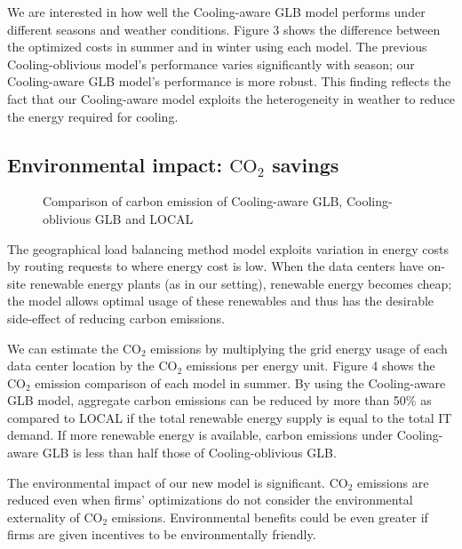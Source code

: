 \documentclass{acm_proc_article-sp}
\newcommand{\carbondioxide}{\ensuremath{\mathrm{CO}_2}}
\begin{document}
We are interested in how well the Cooling-aware GLB model performs under different seasons and weather conditions. Figure 3 shows the difference between the optimized costs in summer and in winter using each model. The previous Cooling-oblivious model's performance varies significantly with season; our Cooling-aware GLB model's performance is more robust. This finding reflects the fact that our Cooling-aware model exploits the heterogeneity in weather to reduce the energy required for cooling.



\subsection{Environmental impact: \carbondioxide{} savings}


\begin{figure}
\centering
{}
\caption{Comparison of carbon emission of Cooling-aware GLB, Cooling-oblivious GLB and LOCAL}
\end{figure}


The geographical load balancing method model exploits variation in energy costs by routing requests to where energy cost is low. When the data centers have on-site renewable energy plants (as in our setting), renewable energy becomes cheap; the model allows optimal usage of these renewables and thus has the desirable side-effect of reducing carbon emissions.

We can estimate the \carbondioxide{} emissions by multiplying the grid energy usage of each data center location by the \carbondioxide{} emissions per energy unit. Figure 4 shows the \carbondioxide{} emission comparison of each model in summer. By using the Cooling-aware GLB model, aggregate carbon emissions can be reduced by more than 50\% as compared to LOCAL if the total renewable energy supply is equal to the total IT demand. If more renewable energy is available, carbon emissions under Cooling-aware GLB is less than half those of Cooling-oblivious GLB.

The environmental impact of our new model is significant. \carbondioxide{} emissions are reduced even when firms' optimizations do not consider the environmental externality of \carbondioxide{} emissions. Environmental benefits could be even greater if firms are given incentives to be environmentally friendly.
\end{document}
